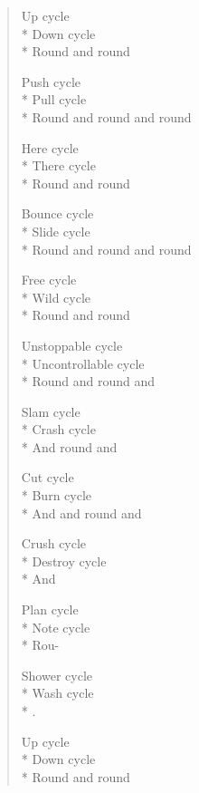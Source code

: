 \begin{verse}
  Up cycle\\*
  Down cycle\\*
  Round and round

  Push cycle\\*
  Pull cycle\\*
  Round and round and round

  Here cycle\\*
  There cycle\\*
  Round and round

  Bounce cycle\\*
  Slide cycle\\*
  Round and round and round

  Free cycle\\*
  Wild cycle\\*
  Round and round

  Unstoppable cycle\\*
  Uncontrollable cycle\\*
  Round and round and

  Slam cycle\\*
  Crash cycle\\*
  And round and

  Cut cycle\\*
  Burn cycle\\*
  And and round and

  \makeatletter%
  \if@twocolumn%
    \newpage%
  \fi
  \makeatother%

  Crush cycle\\*
  Destroy cycle\\*
  And

  Plan cycle\\*
  Note cycle\\*
  Rou-

  Shower cycle\\*
  Wash cycle\\*
  .

  Up cycle\\*
  Down cycle\\*
  Round and round
\end{verse}
